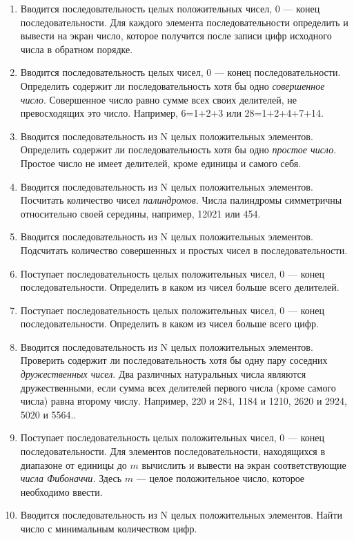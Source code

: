 \begin{enumerate}
\item Вводится последовательность целых положительных чисел, 0 --- конец последовательности. Для каждого элемента
последовательности определить и вывести на экран число, которое получится после записи цифр исходного числа в обратном
порядке.
\item Вводится последовательность целых чисел, 0 --- конец последовательности. Определить содержит ли последовательность
хотя бы одно\emph{ совершенное число}. Совершенное число равно сумме всех своих делителей, не
превосходящих это число. Например, 6=1+2+3 или 28=1+2+4+7+14.
\item Вводится последовательность из N целых положительных элементов. Определить содержит ли последовательность хотя бы
одно \emph{простое число}. Простое число не имеет делителей, кроме единицы и самого себя.
\item Вводится последовательность из N целых положительных элементов. Посчитать количество чисел
\emph{палиндромов}. Числа палиндромы симметричны относительно своей середины, например, 12021 или 454.
\item Вводится последовательность из N целых положительных элементов. Подсчитать количество совершенных и простых чисел
в последовательности.
\item Поступает последовательность целых положительных чисел, 0 --- конец последовательности. Определить в каком из чисел
больше всего делителей.
\item Поступает последовательность целых положительных чисел, 0 --- конец последовательности. Определить в каком из чисел
больше всего цифр. 
\item Вводится последовательность из N целых положительных элементов. Проверить содержит ли последовательность хотя бы
одну пару соседних \emph{дружественных чисел}. Два различных натуральных числа являются дружественными,
если сумма всех делителей первого числа (кроме самого числа) равна второму числу. Например, 220 и 284, 1184 и 1210,
2620 и 2924, 5020 и 5564..
\item Поступает последовательность целых положительных чисел, 0 --- конец последовательности. Для элементов
последовательности, находящихся в диапазоне от единицы до $m$ вычислить и вывести на экран
соответствующие \emph{числа Фибоначчи.} Здесь $m$ — целое положительное число, которое
необходимо ввести.
\item Вводится последовательность из N целых положительных элементов. Найти число с минимальным количеством цифр.

\end{enumerate}
